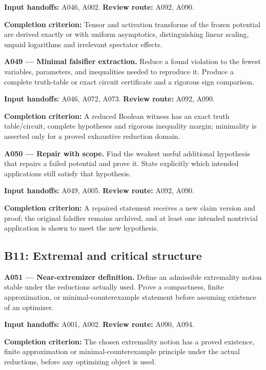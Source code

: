 \documentclass[11pt]{article}
\begin{document}
{\small\color{ink}\textbf{Input handoffs:} A046, A002. \textbf{Review route:} A092, A090.\par
\textbf{Completion criterion:} Tensor and activation transforms of the frozen potential are derived exactly or with uniform asymptotics, distinguishing linear scaling, unpaid logarithms and irrelevant spectator effects.\par}



\textbf{A049 --- Minimal falsifier extraction.} Reduce a found violation to the fewest variables, parameters, and inequalities needed to reproduce it. Produce a complete truth-table or exact circuit certificate and a rigorous sign comparison.

{\small\color{ink}\textbf{Input handoffs:} A046, A072, A073. \textbf{Review route:} A092, A090.\par
\textbf{Completion criterion:} A reduced Boolean witness has an exact truth table/circuit, complete hypotheses and rigorous inequality margin; minimality is asserted only for a proved exhaustive reduction domain.\par}



\textbf{A050 --- Repair with scope.} Find the weakest useful additional hypothesis that repairs a failed potential and prove it. State explicitly which intended applications still satisfy that hypothesis.

{\small\color{ink}\textbf{Input handoffs:} A049, A005. \textbf{Review route:} A092, A090.\par
\textbf{Completion criterion:} A repaired statement receives a new claim version and proof; the original falsifier remains archived, and at least one intended nontrivial application is shown to meet the new hypothesis.\par}



\subsection{B11: Extremal and critical structure}

\textbf{A051 --- Near-extremizer definition.} Define an admissible extremality notion stable under the reductions actually used. Prove a compactness, finite approximation, or minimal-counterexample statement before assuming existence of an optimizer.

{\small\color{ink}\textbf{Input handoffs:} A001, A002. \textbf{Review route:} A090, A094.\par
\textbf{Completion criterion:} The chosen extremality notion has a proved existence, finite approximation or minimal-counterexample principle under the actual reductions, before any optimizing object is used.\par}
\end{document}
